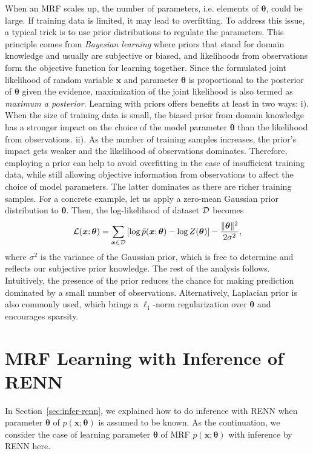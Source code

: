 \begin{remark}
  When an MRF scales up, the number of parameters, i.e. elements of $\bm{\theta}$, could be large. If training data is limited, it may lead to overfitting. To address this issue, a typical trick is to use prior distributions to regulate the parameters. This principle comes from \textit{Bayesian learning} where priors that stand for domain knowledge and usually are subjective or biased, and likelihoods from observations form the objective function for learning together. Since the formulated joint likelihood of random variable $\bm{x}$ and parameter $\bm{\theta}$ is proportional to the posterior of $\bm{\theta}$ given the evidence, maximization of the joint likelihood is also termed as \textit{maximum a posterior}. Learning with priors offers benefits at least in two ways: i). When the size of training data is small, the biased prior from domain knowledge has a stronger impact on the choice of the model parameter $\bm{\theta}$ than the likelihood from observations. ii). As the number of training samples increases, the prior's impact gets weaker and the likelihood of observations dominates. Therefore, employing a prior can help to avoid overfitting in the case of insufficient training data, while still allowing objective information from observations to affect the choice of model parameters. The latter dominates as there are richer training samples. For a concrete example, let us apply a zero-mean Gaussian prior distribution to $\bm{\theta}$. Then, the log-likelihood of dataset $\mathcal{D}$ becomes 
  \begin{equation}
    \mathcal{L}(\bm{x};\bm{\theta}) = \sum_{\bm{x}\in \mathcal{D}}\left[ \log{\tilde{p}(\bm{x}; \bm{\theta})} - \log{Z(\bm{\theta})}  \right] - \frac{\| \bm{\theta} \|^2}{2\sigma^2},
  \end{equation}
  where $\sigma^2$ is the variance of the Gaussian prior, which is free to determine and reflects our subjective prior knowledge. The rest of the analysis follows. Intuitively, the presence of the prior reduces the chance for making prediction dominated by a small number of observations. 
Alternatively, Laplacian prior is also commonly used, which brings a $\ell_1$-norm regularization over $\bm{\theta}$ and encourages sparsity.

\end{remark}


\section{MRF Learning with Inference of RENN}
\label{sec:model-learning-with-renn}
In Section~\ref{sec:infer-renn}, we explained how to do inference with RENN when parameter $\bm{\theta}$ of $p(\bm{x}; \bm{\theta})$ is assumed to be known. As the continuation, we consider the case of learning parameter $\bm{\theta}$ of MRF $p(\bm{x}; \bm{\theta})$ with inference by RENN here.

